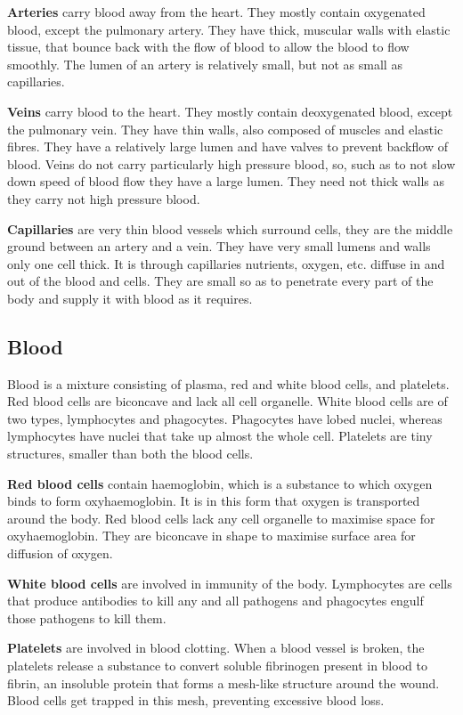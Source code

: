 \textbf{Arteries} carry blood away from the heart. They mostly contain oxygenated blood, except the
pulmonary artery. They have thick, muscular walls with elastic tissue, that bounce back with the
flow of blood to allow the blood to flow smoothly. The lumen of an artery is relatively small, but
not as small as capillaries.

\textbf{Veins} carry blood to the heart. They mostly contain deoxygenated blood, except the 
pulmonary vein. They have thin walls, also composed of muscles and elastic fibres. They have a 
relatively large lumen and have valves to prevent backflow of blood. Veins do not carry 
particularly high pressure blood, so, such as to not slow down speed of blood flow they have a 
large lumen. They need not thick walls as they carry not high pressure blood.

\textbf{Capillaries} are very thin blood vessels which surround cells, they are the middle ground
between an artery and a vein. They have very small lumens and walls only one cell thick. It is 
through capillaries nutrients, oxygen, etc. diffuse in and out of the blood and cells. They are 
small so as to penetrate every part of the body and supply it with blood as it requires.

\subsection{Blood}
Blood is a mixture consisting of plasma, red and white blood cells, and platelets. Red blood cells
are biconcave and lack all cell organelle. White blood cells are of two types, lymphocytes and
phagocytes. Phagocytes have lobed nuclei, whereas lymphocytes have nuclei that take up almost the
whole cell. Platelets are tiny structures, smaller than both the blood cells.

\textbf{Red blood cells} contain haemoglobin, which is a substance to which oxygen binds to form
oxyhaemoglobin. It is in this form that oxygen is transported around the body. Red blood cells
lack any cell organelle to maximise space for oxyhaemoglobin. They are biconcave in shape to 
maximise surface area for diffusion of oxygen.

\textbf{White blood cells} are involved in immunity of the body. Lymphocytes are cells that produce
antibodies to kill any and all pathogens and phagocytes engulf those pathogens to kill them.

\textbf{Platelets} are involved in blood clotting. When a blood vessel is broken, the platelets
release a substance to convert soluble fibrinogen present in blood to fibrin, an insoluble protein
that forms a mesh-like structure around the wound. Blood cells get trapped in this mesh, preventing
excessive blood loss.

